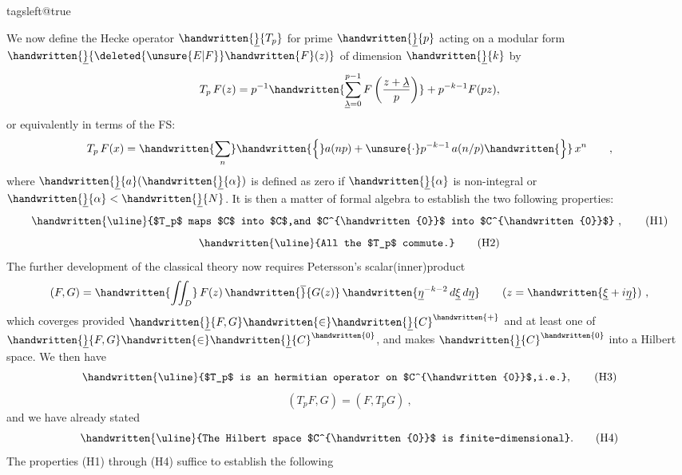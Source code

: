 \noindent\hfill{}\par
\begingroup
\csname tagsleft@true\endcsname

We now define the Hecke operator $\handwritten{\underline}{T_p}$ for prime $\handwritten{\underline}{p}$ acting on a modular form $\handwritten{\underline}{\deleted{\unsure{E|F}}\handwritten{F}(z)}$ of dimension $\handwritten{\underline}{k}$ by
\[
T_p\,F(z)=p^{-1}\handwritten{\sum_{\underline{\lambda}=0}^{p-1}F\left(\frac{z+\underline{\lambda}}{p}\right)}
+p^{-k-1}F(pz),
\]
or equivalently in terms of the FS:
\[
T_p\,F(x)=\handwritten{\sum_n}\handwritten{\Bigl\{}a(np)+\unsure{\cdot}p^{-k-1}\,a(n/p)\handwritten{\Bigr\}}\,x^n\qquad ,
\]
where $\handwritten{\underline}{a}(\handwritten{\underline}{\alpha})$ is defined as zero if $\handwritten{\underline}{\alpha}$ is non-integral or $\handwritten{\underline}{\alpha}<\handwritten{\underline}{N}$. It is then a matter of formal algebra to establish the two following properties:
\[
\text{\handwritten{\uline}{$T_p$ maps $C$ into $C$,and $C^{\handwritten{0}}$ into $C^{\handwritten{0}}$}}\ ,
\tag*{(H1)}
\]
\[
\text{\handwritten{\uline}{All the $T_p$ commute.}}
\tag*{(H2)}
\]
The further development of the classical theory now requires Petersson's scalar(inner)product
\[
(F,G)=\handwritten{\iint_{D}}\,F(z)\,\handwritten{\overline}{G(z)}\,\handwritten{\underline{\eta}^{-k-2}\,d\underline{\xi}\,d\underline{\eta}}
\qquad (z=\handwritten{\underline{\xi}+i\underline{\eta}})\ ,
\]
which coverges provided $\handwritten{\underline}{F,G}\handwritten{\in}\handwritten{\underline}{C}^{\handwritten{+}}$ and at least one of $\handwritten{\underline}{F,G}\handwritten{\in}\handwritten{\underline}{C}^{\handwritten{0}}$, and makes $\handwritten{\underline}{C}^{\handwritten{0}}$ into a Hilbert space. We then have
\[
\text{\handwritten{\uline}{$T_p$ is an hermitian operator on $C^{\handwritten{0}}$,i.e.}}, 
\tag*{(H3)}
\]
\[
(T_pF,G)=(F,T_pG)\ ,
\]
and we have already stated
\[
\text{\handwritten{\uline}{The Hilbert space $C^{\handwritten{0}}$ is finite-dimensional}.}
\tag*{(H4)}
\]
The properties (H1) through (H4) suffice to establish the following

